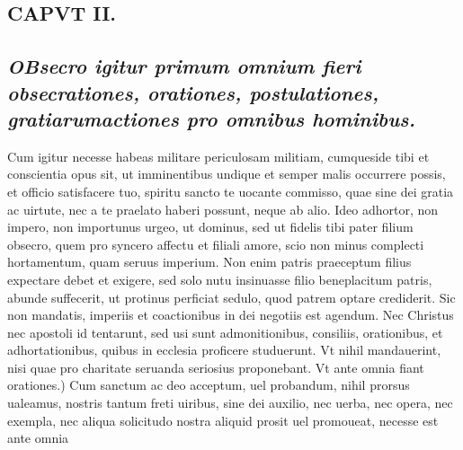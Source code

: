 \documentclass{article}
\begin{document}
\begin{pages}
\section{CAPVT II.}
{}
\subsection*{\textit{\huge\textbf{O}\normalsize Bsecro igitur primum omnium fieri obsecrationes, orationes, postulationes, gratiarumactiones pro omnibus hominibus. }}\pstart Cum igitur necesse habeas militare periculosam militiam, cumqueside tibi et conscientia opus sit, ut imminentibus undique  et semper malis occurrere possis, et officio satisfacere tuo, spiritu sancto te uocante commisso, quae sine dei gratia ac uirtute, nec a te praelato haberi possunt, neque  ab alio. Ideo adhortor, non impero, non importunus urgeo, ut dominus, sed ut fidelis tibi pater filium obsecro, quem pro syncero affectu et filiali amore, scio non minus complecti hortamentum, quam seruus imperium. Non enim patris praeceptum filius expectare debet et exigere, sed solo nutu insinuasse filio beneplacitum patris, abunde suffecerit, ut protinus perficiat sedulo, quod patrem optare crediderit. Sic non mandatis, imperiis et coactionibus in dei negotiis est agendum. Nec Christus nec apostoli id tentarunt, sed usi sunt admonitionibus, consiliis, orationibus, et adhortationibus, quibus in ecclesia proficere studuerunt. Vt nihil mandauerint, nisi quae pro charitate seruanda seriosius proponebant. Vt ante omnia fiant orationes.) Cum sanctum ac deo acceptum, uel probandum, nihil prorsus ualeamus, nostris tantum freti uiribus, sine dei auxilio, nec uerba, nec opera, nec exempla, nec aliqua solicitudo nostra aliquid prosit uel promoueat, necesse est ante omnia  \pend

\end{pages}
\end{document}
